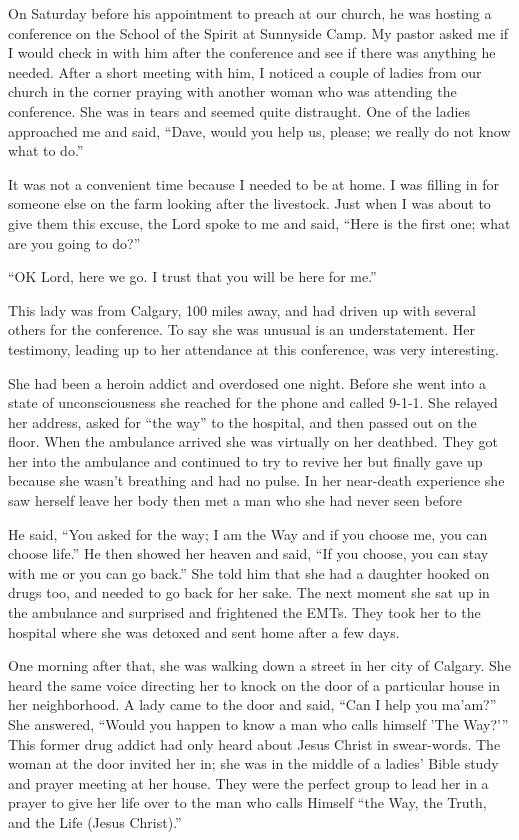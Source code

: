 \documentclass[twoside, 12pt]{book}
\begin{document}
On Saturday before his appointment to preach at our church, he was hosting a conference on the School of the Spirit at Sunnyside Camp. My pastor asked me if I would check in with him after the conference and see if there was anything he needed. After a short meeting with him, I noticed a couple of ladies from our church in the corner praying with another woman who was attending the conference. She  was in tears and seemed quite distraught. One of the ladies approached me and said, “Dave, would you help us, please; we really do not know what to do.”

 It was not a convenient time because I needed to be at home. I was filling in for someone else on the farm looking after the livestock. Just when I was about to give them this excuse, the Lord spoke to me and said, “Here is the first one; what are you going to do?”

 “OK Lord, here we go. I trust that you will be here for me.” 

This lady was from Calgary, 100 miles away, and had driven up with several others for the conference. To say she was unusual is an understatement. Her testimony, leading up to her attendance at this conference, was very interesting.

She had been a heroin addict and overdosed one night. Before she went into a state of unconsciousness she reached for the phone and called 9-1-1. She relayed her address, asked for “the way” to the hospital, and then passed out on the floor. When the ambulance arrived she was virtually on her deathbed. They got her into the ambulance and continued to try to revive her but finally gave up because she wasn't breathing and had no pulse. In her near-death experience she saw herself leave her body then met a man who she had never seen before

He said, “You asked for the way; I am the Way and if you choose me, you can choose life.”  He then showed her heaven and said, “If you choose, you can stay with me or you can go back.” She told him that she had a daughter hooked on drugs too, and needed to go back for her sake. The next moment she sat up in the ambulance and surprised and frightened the EMTs. They took her to the hospital where she was detoxed and sent home after a few days.

One morning after that, she was walking down a street in her city of Calgary. She heard the same voice directing her to knock on the door of a particular house in her neighborhood. A lady came to the door and said, “Can I help you ma'am?” She answered, “Would you happen to know a man who calls himself 'The Way?’” This former drug addict had only heard about Jesus Christ in swear-words. The woman at the door invited her in; she was in the middle of a ladies’ Bible study and prayer meeting at her house. They were the perfect group to lead her in a prayer to give her life over to the man who calls Himself “the Way, the Truth, and the Life (Jesus Christ).”
\end{document}
